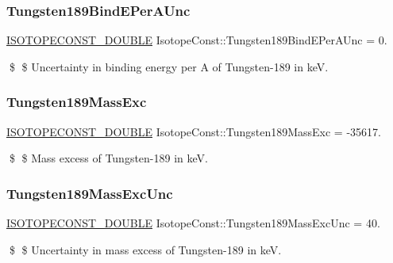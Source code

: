 \subsubsection{\texorpdfstring{Tungsten189\+Bind\+E\+Per\+A\+Unc}{Tungsten189BindEPerAUnc}}
{\footnotesize\ttfamily \mbox{\hyperlink{group___isotope_const-_macros_ga8f45a7272ce02c0b4c65c44636ed719a}{I\+S\+O\+T\+O\+P\+E\+C\+O\+N\+S\+T\+\_\+\+D\+O\+U\+B\+LE}} Isotope\+Const\+::\+Tungsten189\+Bind\+E\+Per\+A\+Unc = 0.}

\$ \$ Uncertainty in binding energy per A of Tungsten-\/189 in keV. \mbox{\label{group___isotope_const-_tungsten-_w189_gab31a2ddf03adfc33dc97c68ce67f6a46}} 
\subsubsection{\texorpdfstring{Tungsten189\+Mass\+Exc}{Tungsten189MassExc}}
{\footnotesize\ttfamily \mbox{\hyperlink{group___isotope_const-_macros_ga8f45a7272ce02c0b4c65c44636ed719a}{I\+S\+O\+T\+O\+P\+E\+C\+O\+N\+S\+T\+\_\+\+D\+O\+U\+B\+LE}} Isotope\+Const\+::\+Tungsten189\+Mass\+Exc = -\/35617.}

\$ \$ Mass excess of Tungsten-\/189 in keV. \mbox{\label{group___isotope_const-_tungsten-_w189_ga8f037f52ee12ba547a8a5d4b990f9790}} 
\subsubsection{\texorpdfstring{Tungsten189\+Mass\+Exc\+Unc}{Tungsten189MassExcUnc}}
{\footnotesize\ttfamily \mbox{\hyperlink{group___isotope_const-_macros_ga8f45a7272ce02c0b4c65c44636ed719a}{I\+S\+O\+T\+O\+P\+E\+C\+O\+N\+S\+T\+\_\+\+D\+O\+U\+B\+LE}} Isotope\+Const\+::\+Tungsten189\+Mass\+Exc\+Unc = 40.}

\$ \$ Uncertainty in mass excess of Tungsten-\/189 in keV. \mbox{\label{group___isotope_const-_tungsten-_w189_ga937c963fb18a48c67e69a498aa0aebb5}} 
